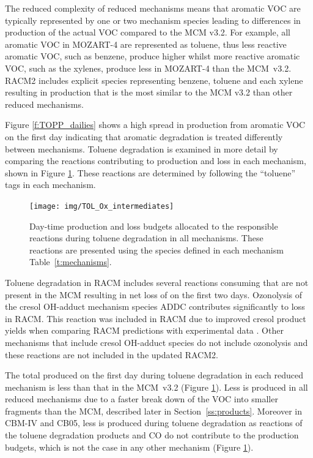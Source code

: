 The reduced complexity of reduced mechanisms means that aromatic VOC are typically represented by one or two mechanism species leading to differences in  production of the actual VOC compared to the MCM v3.2.
For example, all aromatic VOC in MOZART-4 are represented as toluene, thus less reactive aromatic VOC, such as benzene, produce higher  whilst more reactive aromatic VOC, such as the xylenes, produce less  in MOZART-4 than the \mbox{MCM v3.2}.
RACM2 includes explicit species representing benzene, toluene and each xylene resulting in  production that is the most similar to the MCM v3.2 than other reduced mechanisms.

Figure \ref{f:TOPP_dailies} shows a high spread in  production from aromatic VOC on the first day indicating that aromatic degradation is treated differently between mechanisms.
Toluene degradation is examined in more detail by comparing the reactions contributing to  production and loss in each mechanism, shown in Figure \ref{f:toluene_Ox}. 
These reactions are determined by following the ``toluene'' tags in each mechanism.

%
\begin{figure}
    \centering
    \texttt{[image: img/TOL\_Ox\_intermediates]}
    \vspace{0mm}
    \caption{Day-time  production and loss budgets allocated to the responsible reactions during toluene degradation in all mechanisms. These reactions are presented using the species defined in each mechanism \mbox{Table \ref{t:mechanisms}.}}
    \vspace{-4mm}
    \label{f:toluene_Ox}
\end{figure}
%
Toluene degradation in RACM includes several reactions consuming  that are not present in the MCM resulting in net loss of  on the first two days.
Ozonolysis of the cresol OH-adduct mechanism species ADDC contributes significantly to  loss in RACM.
This reaction was included in RACM due to improved cresol product yields when comparing RACM predictions with experimental data \citep{Stockwell:1997}. 
Other mechanisms that include cresol OH-adduct species do not include ozonolysis and these reactions are not included in the updated RACM2.

The total  produced on the first day during toluene degradation in each reduced mechanism is less than that in the \mbox{MCM v3.2} (Figure \ref{f:toluene_Ox}).
Less  is produced in all reduced mechanisms due to a faster break down of the VOC into smaller fragments than the MCM, described later in \mbox{Section \ref{ss:products}}.
Moreover in CBM-IV and CB05, less  is produced during toluene degradation as reactions of the toluene degradation products  and CO do not contribute to the  production budgets, which is not the case in any other mechanism (Figure \ref{f:toluene_Ox}).


